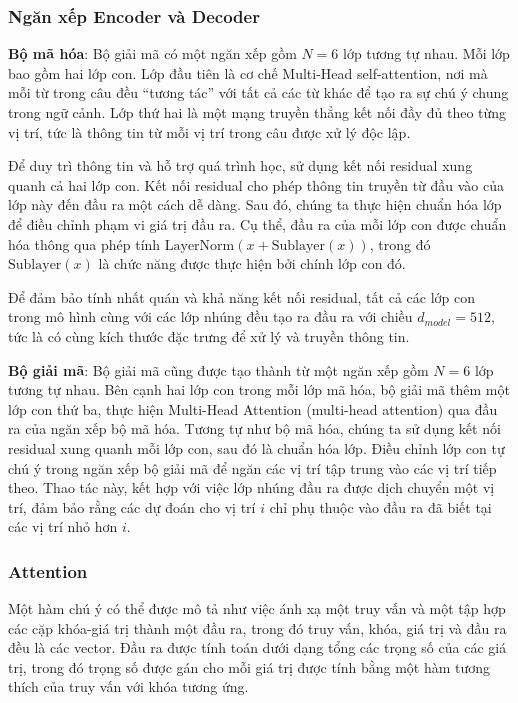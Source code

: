\subsubsection*{Ngăn xếp Encoder và Decoder}
\textbf{Bộ mã hóa}: Bộ giải mã có một ngăn xếp gồm $N = 6$ lớp tương tự nhau. Mỗi lớp bao gồm hai lớp con. Lớp đầu tiên là cơ chế Multi-Head self-attention, nơi mà mỗi từ trong câu đều ``tương tác'' với tất cả các từ khác để tạo ra sự chú ý chung trong ngữ cảnh. Lớp thứ hai là một mạng truyền thẳng kết nối đầy đủ theo từng vị trí, tức là thông tin từ mỗi vị trí trong câu được xử lý độc lập.

Để duy trì thông tin và hỗ trợ quá trình học, sử dụng kết nối residual xung quanh cả hai lớp con. Kết nối residual cho phép thông tin truyền từ đầu vào của lớp này đến đầu ra một cách dễ dàng. Sau đó, chúng ta thực hiện chuẩn hóa lớp để điều chỉnh phạm vi giá trị đầu ra. Cụ thể, đầu ra của mỗi lớp con được chuẩn hóa thông qua phép tính $\text{LayerNorm}(x + \text{Sublayer}(x))$, trong đó $\text{Sublayer}(x)$ là chức năng được thực hiện bởi chính lớp con đó.

Để đảm bảo tính nhất quán và khả năng kết nối residual, tất cả các lớp con trong mô hình cùng với các lớp nhúng đều tạo ra đầu ra với chiều $d_{model} = 512$, tức là có cùng kích thước đặc trưng để xử lý và truyền thông tin.

\textbf{Bộ giải mã}: Bộ giải mã cũng được tạo thành từ một ngăn xếp gồm $N = 6$ lớp tương tự nhau. Bên cạnh hai lớp con trong mỗi lớp mã hóa, bộ giải mã thêm một lớp con thứ ba, thực hiện Multi-Head Attention (multi-head attention) qua đầu ra của ngăn xếp bộ mã hóa. Tương tự như bộ mã hóa, chúng ta sử dụng kết nối residual xung quanh mỗi lớp con, sau đó là chuẩn hóa lớp. Điều chỉnh lớp con tự chú ý trong ngăn xếp bộ giải mã để ngăn các vị trí tập trung vào các vị trí tiếp theo. Thao tác này, kết hợp với việc lớp nhúng đầu ra được dịch chuyển một vị trí, đảm bảo rằng các dự đoán cho vị trí $i$ chỉ phụ thuộc vào đầu ra đã biết tại các vị trí nhỏ hơn $i$.

\subsubsection*{Attention}
Một hàm chú ý có thể được mô tả như việc ánh xạ một truy vấn và một tập hợp các cặp khóa-giá trị thành một đầu ra, trong đó truy vấn, khóa, giá trị và đầu ra đều là các vector. Đầu ra được tính toán dưới dạng tổng các trọng số của các giá trị, trong đó trọng số được gán cho mỗi giá trị được tính bằng một hàm tương thích của truy vấn với khóa tương ứng.

